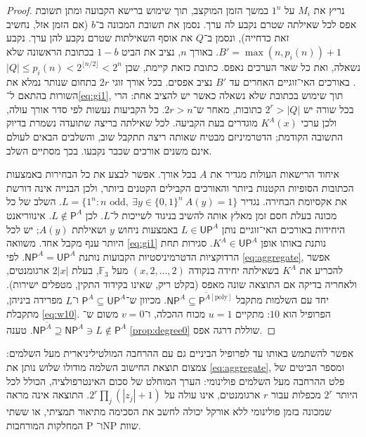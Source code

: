 \documentclass[11pt,a4paper]{article}
\theoremstyle{definition}
\theoremstyle{remark}
\newcommand{\EN}[1]{\textenglish{#1}}
\newcommand{\bits}{\{0,1\}}
\newcommand{\PP}{\mathsf{P}}
\newcommand{\NP}{\mathsf{NP}}
\newcommand{\UP}{\mathsf{UP}}
\newcommand{\Atil}{\widetilde A}
\newcommand{\F}{\mathbb F}
\begin{document}
\begin{proof}
נריץ את $M_i$ על $1^n$ במשך הזמן המוקצב, תוך שימוש ברישא הקבועה ומתן תשובת אפס לכל שאילתה שטרם נקבע לה ערך. נסמן את תשובת המכונה ב־$b$ (אם הזמן אזל, נחשיב זאת כדחייה), ונסמן ב־$Q$ את אוסף השאילתות שטרם נקבע להן ערך. נקבע $B'=\max(n,p_i(n))+1$. באורך $n$, נציב את הביט $1-b$ בכתובת הראשונה שלא נשאלה, ואת כל שאר הערכים נאפס. כתובת כזאת קיימת, שכן $|Q|\le p_i(n)<2^{\lfloor n/2\rfloor}<2^n$. באורכים האי־זוגיים האחרים עד $B'$ נציב אפסים. בכל אורך זוגי $2r$ בתחום שנותר נמלא את השורות בהתאם ל־\eqref{eq:gi1}, תוך שימוש בכתובת שלא נשאלה כאשר יש להציב אחת: הרי בכל שורה יש $2^r>|Q|$ כתובות, מאחר ש־$2r>n$. כל הקביעות נעשות לפי סדר אורך עולה, ולכן ערכי $K^A(x)$ מוגדרים בעת הקביעה. לכל שאילתה בריצה שתועדה נשמרת בדיוק התשובה הקודמת; הדטרמיניזם מבטיח שאותה ריצה תתקבל שוב, והשלבים הבאים לעולם אינם משנים אורכים שכבר נקבעו. בכך מסתיים השלב.

איחוד הרישאות העולות מגדיר את $A$ בכל אורך. אפשר לבצע את כל הבחירות באמצעות הכתובות הסופיות הקטנות ביותר והאורכים הקבילים הקטנים ביותר, ולכן הבנייה אינה דורשת את אקסיומת הבחירה. נגדיר $L=\{1^n:n\text{ odd},\ \exists y\in\bits^n\ A(y)=1\}$. השלב של כל מכונה בעלת חסם זמן מאלץ אותה להשיב בניגוד לשייכות ל־$L$. לכן $L\notin\PP^A$. אינווריאנט היחידות באורכים האי־זוגיים נותן $L\in\UP^A$ באמצעות ניחוש $y$ ושאילתת $A(y)$; יש לכל היותר ענף מקבל אחד. משוואה \eqref{eq:gi1} נותנת באותו אופן $K^A\in\UP^A$. סגירות תחת הרדוקציות הדטרמיניסטיות הקבועות נותנת $\NP^A=\UP^A$. לפי \eqref{eq:aggregate}, אפשר להכריע את $K^A$ בשאילתה יחידה בנקודה $(x,2,\ldots,2)$ מעל $\F_3$, בעלת $2|x|$ ארגומנטים, ולאחריה בדיקה אם התוצאה שונה מאפס (בקלט ריק, שאינו בקידוד התקין, מטפלים ישירות). יחד עם השלמות מתקבל $\NP^A\subseteq\PP^{\Atil[\mathrm{poly}]}$. מכיוון ש־$\PP^A\subseteq\UP^A$ ו־$L$ מפרידה ביניהן, מתקבלת \eqref{eq:w10}. הפרופיל הוא $10$: מתקיים $u=1$ מכוח ההכלה, ו־$v=0$ משום ש־$\NP^{\Atil}\supseteq\NP^A\ni L\notin\PP^A$. טענה \ref{prop:degree0} שוללת דרגה אפס.
\end{proof}
אפשר להשתמש באותו עד לפרופיל הביניים גם עם ההרחבה המולטיליניארית מעל השלמים: צמצום תוצאת החישוב השלמה מודולו שלוש נותן את \eqref{eq:aggregate}, ומספר הביטים של פלט ההרחבה מעל השלמים פולינומי: הערך המוחלט של סכום האינטרפולציה, הכולל לכל היותר $2^r$ מכפלות עבור $r$ ארגומנטים, אינו עולה על $2^r\prod_j(|z_j|+1)$. התוצאה אינה מראה שמכונה בזמן פולינומי ללא אורקל יכולה לחשב את הסכימה מתיאור תמציתי, או ששתי המחלקות המורחבות \EN{P} ו־\EN{NP} שוות.

\end{document}

